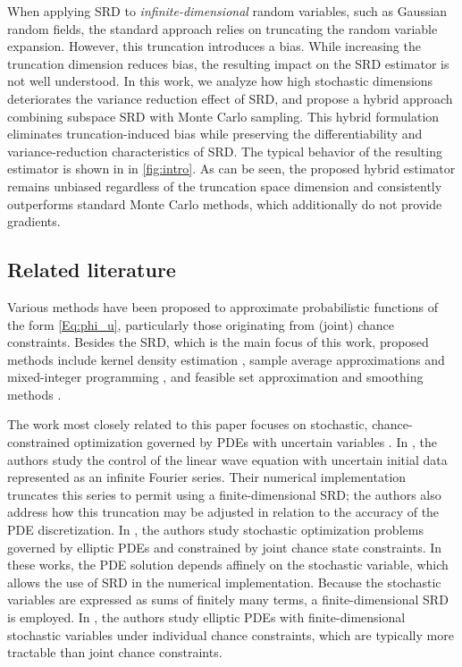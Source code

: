 \documentclass[%
onefignum,onetabnum]{siamonline250211}
\begin{document}
When applying SRD to \emph{infinite-dimensional} random variables, such as Gaussian random fields, the standard approach relies on truncating the random variable expansion. However, this truncation introduces a bias. While increasing the truncation dimension reduces bias, the resulting impact on the SRD estimator is not well understood. In this work, we analyze how high stochastic dimensions deteriorates the variance reduction effect of SRD, and propose a hybrid approach combining subspace SRD with Monte Carlo sampling. This hybrid formulation eliminates truncation-induced bias while preserving the differentiability and variance-reduction characteristics of SRD. The typical behavior of the resulting estimator is shown in
in \cref{fig:intro}. As can be seen, the proposed hybrid estimator remains unbiased regardless of the truncation space dimension and consistently outperforms standard Monte Carlo methods, which additionally do not provide gradients.

\subsection{Related literature}

Various methods have been proposed to approximate probabilistic functions of the form \eqref{Eq:phi_u}, particularly those originating from (joint) chance constraints. Besides the SRD, which is the main focus of this work, proposed methods include kernel density estimation \cite{CaCeSaTrZi-OCAM18}, sample average approximations and mixed-integer programming
\cite{LuShNe-MP10, PaAhSh-JOTA09},
and feasible set approximation and smoothing methods \cite{NeSh-SIAM07, HoYaZh-OR11, PeLuWa-SIAM20}.

The work most closely related to this paper focuses on stochastic, chance-constrained optimization governed by PDEs with uncertain variables \cite{FarshbafShakerGugatHeitschEtAl20, HeStWe-SIAM25, geiersbach2025numerical, geletu2020}.
In \cite{FarshbafShakerGugatHeitschEtAl20}, the authors study the control of the linear wave equation with uncertain initial data represented as an infinite Fourier series. Their numerical implementation truncates this series to permit using a finite-dimensional SRD; the authors also address how this truncation may be adjusted in relation to the accuracy of the PDE discretization. In \cite{geiersbach2025numerical, HeStWe-SIAM25}, the authors study stochastic optimization problems governed by elliptic PDEs and constrained by joint chance state constraints. In these works, the PDE solution depends affinely on the stochastic variable, which allows the use of SRD in the numerical implementation. Because the stochastic variables are expressed as sums of finitely many terms, a finite-dimensional SRD is employed. In \cite{geletu2020}, the authors study elliptic PDEs with finite-dimensional stochastic variables under individual chance constraints, which are typically more tractable than joint chance constraints.
\end{document}
